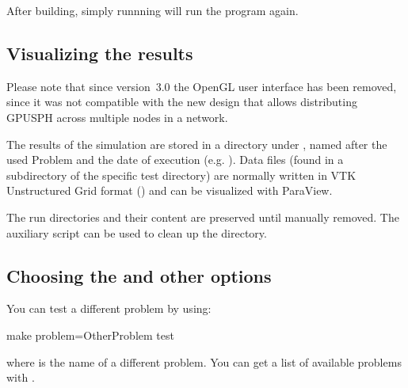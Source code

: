 \documentclass[12pt]{memoir}
\begin{document}
After building, simply runnning  will run the program
again.

\subsection{Visualizing the results}

Please note that since version~3.0 the OpenGL user interface has been
removed, since it was not compatible with the new design that allows
distributing GPUSPH across multiple nodes in a network.


The results of the simulation are stored in a directory under
, named after the used Problem and the date of execution
(e.g. ). Data files (found in a
 subdirectory of the specific test directory) are normally
written in VTK Unstructured Grid format () and can be
visualized with ParaView.

\iffalse %
\begin{figure}
\centering{%
\texttt{[image: DamBreak3D.png]}%
}
\caption{Initial OpenGL window for the problem DamBreak3DObjects,
showing the fluid behind the dam on the right and the containment tank
in green and structure in red in the middle of the tank. There are
10,664 particles in this example problem, 6000 of which are fluid
particles. The remaining particles form the boundaries. Note the
caption indicating that to initiate the computation, you have to tap the
space bar.}
\end{figure}
\else
{}
\fi

The run directories and their content are preserved until manually
removed. The  auxiliary script can be used to clean
up the  directory.

\subsection{Choosing the  and other options}

You can test a different problem by using:
\begin{shellcode}
make problem=OtherProblem test
\end{shellcode}
where  is the name of a different problem. You can get
a list of available problems with .
\end{document}
